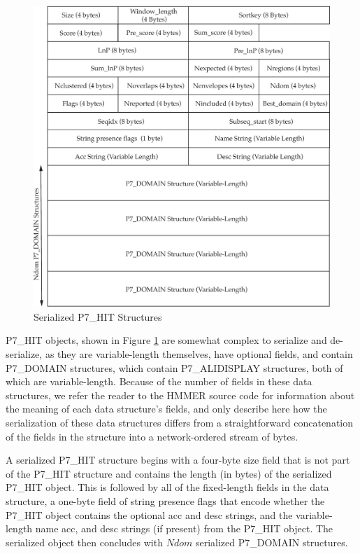 \documentclass[notoc,justified,openany]{tufte-book}    %
\begin{document}
  \begin{figure}
    \includegraphics[width=\textwidth]{inclusions/hit-serialize.pdf}
    \caption{Serialized {P7\_HIT} Structures}
    \label{fig:hit-serialize}
  \end{figure}

  {P7\_HIT} objects, shown in Figure \ref{fig:hit-serialize} are somewhat complex to serialize and de-serialize, as they are variable-length themselves, have optional fields, and contain {P7\_DOMAIN} structures, which contain {P7\_ALIDISPLAY} structures, both of which are variable-length.  Because of the number of fields in these data structures, we refer the reader to the {HMMER} source code for information about the meaning of each data structure's fields, and only describe here how the serialization of these data structures differs from a straightforward concatenation of the fields in the structure into a network-ordered stream of bytes.

  A serialized {P7\_HIT} structure begins with a four-byte size field that is not part of the {P7\_HIT} structure and contains the length (in bytes)
  of the serialized {P7\_HIT} object.  This is followed by all of the fixed-length fields in the data structure, a one-byte field of string presence flags that encode whether the {P7\_HIT} object contains the optional acc and desc strings, and the variable-length name acc, and desc strings (if present) from the {P7\_HIT} object.  The serialized object then concludes with $Ndom$ serialized {P7\_DOMAIN} structures.
\end{document}
